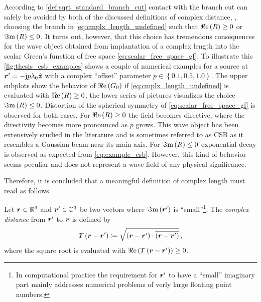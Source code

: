 According to \cref{def:sqrt_standard_branch_cut} contact with the branch cut can
safely be avoided by both of the discussed definitions of complex distance, \ie,
choosing the branch in \eqref{eq:cmplx_length_undefined} such that
$\Re\mathrm{e}\left(R\right) \geq 0$ or $\Im\mathrm{m}\left(R\right) \leq 0$.
It turns out, however, that this choice has tremendous consequences for the
wave object obtained from implantation of a complex length into the scalar
Green's function of free space \eqref{eq:scalar_free_space_gf}.
To illustrate this \cref{fig:thesis_csb_examples} shows a couple of numerical
examples for a source at $\rsrc = -\im p \lambda_0 \uv{z}$ with a complex
\enquote{offset} parameter 
$p \in \left\{\num{0.1}, \num{0.5}, \num{1.0}\right\}$.
The upper subplots show the behavior of $\Re\mathrm{e}\left(G_0\right)$ if
\eqref{eq:cmplx_length_undefined} is evaluated with $\Re\mathrm{e}\left(R\right) \geq 0$,
the lower series of pictures visualizes the choice $\Im\mathrm{m}\left(R\right) \leq 0$.
Distortion of the spherical symmetry of \eqref{eq:scalar_free_space_gf}
is observed for both cases.
For $\Re\mathrm{e}\left(R\right) \geq 0$ the field becomes directive, where the directivity
becomes more pronounced as $p$ grows.
This wave object has been extensively studied in the literature
\cite{Deschamps1971,Keller1971,Couture1981} and is sometimes referred to as
\ac{CSB} \cite{Hansen2009,Hansen2013} as it resembles a
Gaussian beam \cite[pp.~626]{hecht2017} near its main axis.
For $\Im\mathrm{m}\left(R\right) \leq 0$ exponential decay is observed as expected from
\eqref{eq:example_csb}.
However, this kind of behavior seems peculiar and does not represent a wave
field of any physical significance.

Therefore, it is concluded that a meaningful definition of complex length must
read as follows.
\begin{definition}\label{def:cmplx_distance}
	Let $\robs \in \R^3$ and $\rsrc \in \C^3$ be two vectors where
	$\imag{\rsrc}$ is \enquote{small}\footnote{In computational practice the
	requirement for $\rsrc$ to have a \enquote{small} imaginary part mainly
	addresses numerical problems of verly large floating point numbers.}.
	The \emph{complex distance} from $\rsrc$ to $\robs$ is defined by
	\begin{equation}\label{eq:def:cmplx_distance}
		\cmplxlength{\rdiff} 
		\coloneqq
		\sqrt{\left(\rdiff\right) \cdot \overline{\left(\rdiff\right)}}
		\, ,
	\end{equation}
	where the square root is evaluated with
	$\real{\cmplxlength{\rdiff}} \geq 0$.
\end{definition}

